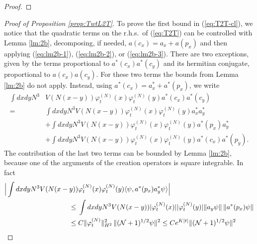 \documentclass[11pt,a4paper]{article}
\newcommand{\ekt}{e^{K\lvert t\rvert}}	%
\newcommand{\cN}{{\cal N}}
\begin{document}
\begin{proof}
\end{proof} 

\begin{proof}[Proof of Proposition \ref{prop:TwtL2T}]
To prove the first bound in (\ref{eq:T2T-cl}), we notice that the quadratic terms on the r.h.s.\ of (\ref{eq:T2T}) can be controlled with Lemma \ref{lm:2b}, decomposing, if needed, $a (c_x) = a_x + a(p_x)$ and then applying (\ref{eq:lm2b-1}), (\ref{eq:lm2b-2}), or (\ref{eq:lm2b-3}). There are two exceptions, given by the terms proportional to $a^* (c_x) a^* (c_y)$ and its hermitian conjugate, proportional to $a (c_x) a(c_y)$. For these two terms the bounds from Lemma \ref{lm:2b} do not apply. Instead, using $a^* (c_x) = a^*_x + a^* (p_x)$, we write 
\begin{equation}\label{eq:2-cancel} \begin{split} 
\int dx dy N^3 & V(N (x-y)) \varphi_t^{(N)} (x) \varphi_t^{(N)} (y) a^* (c_x) a^* (c_y) \\ = \; &   
\int dx dy N^3 V(N (x-y)) \varphi_t^{(N)} (x) \varphi_t^{(N)} (y) a_x^* a_y^* \\ &+ 
\int dx dy N^3 V(N (x-y)) \varphi_t^{(N)} (x) \varphi_t^{(N)} (y) a^* (p_x) a_y^* \\ &+ 
\int dx dy N^3 V(N (x-y)) \varphi_t^{(N)} (x) \varphi_t^{(N)} (y) a^* (c_x) a^* (p_y).
 \end{split} \end{equation}
The contribution of the last two terms can be bounded by Lemma \ref{lm:2b}, because one of the arguments of the creation operators is square integrable. In fact
\[ \begin{split} \Big| \int dx dy N^3 V(N (x-y)) &\varphi_t^{(N)} (x) \varphi_t^{(N)} (y)  \langle \psi , a^* (p_x) a_y^* \psi \rangle \Big| \\ \leq \; & \int dx dy N^3 V(N (x-y)) |\varphi_t^{(N)} (x)| |\varphi_t^{(N)} (y)|   \| a_y \psi \| \, \| a^* (p_x) \psi \|   \\ \leq \; & C \| \varphi_t^{(N)} \|_{H^2}^2 \, \| (\cN+1)^{1/2} \psi \|^2 \leq C \ekt \| (\cN+1)^{1/2} \psi \|^2

\end{split}\]
\end{proof}
\end{document}
